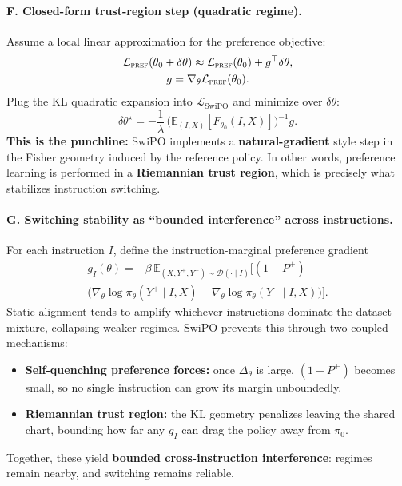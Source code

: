 \vspace{-0.35em}
\paragraph{\textbf{F. Closed-form trust-region step (quadratic regime).}}
Assume a local linear approximation for the preference objective:
\begin{gather*}
\mathcal{L}_{\textsc{pref}}(\theta_0+\delta\theta)
\approx
\mathcal{L}_{\textsc{pref}}(\theta_0)+g^\top\delta\theta,\\
g=\nabla_\theta\mathcal{L}_{\textsc{pref}}(\theta_0).
\end{gather*}
Plug the KL quadratic expansion into $\mathcal{L}_{\mathrm{SwiPO}}$ and minimize over $\delta\theta$:
\[
\delta\theta^\star
=
-\frac{1}{\lambda}\,
\Big(\mathbb{E}_{(I,X)}[F_{\theta_0}(I,X)]\Big)^{-1}g.
\]
\textbf{This is the punchline:} SwiPO implements a \textbf{natural-gradient} style step in the Fisher geometry induced by the reference policy. In other words, preference learning is performed in a \textbf{Riemannian trust region}, which is precisely what stabilizes instruction switching.

\vspace{-0.35em}
\paragraph{\textbf{G. Switching stability as ``bounded interference'' across instructions.}}
For each instruction $I$, define the instruction-marginal preference gradient
{\footnotesize
\begin{multline*}
g_I(\theta)
=
-\beta\,
\mathbb{E}_{(X,Y^+,Y^-)\sim\mathcal{D}(\cdot\mid I)}
\Big[(1-P^+)\\
\big(
\nabla_\theta\log\pi_\theta(Y^+\mid I,X)
-\nabla_\theta\log\pi_\theta(Y^-\mid I,X)
\big)
\Big].
\end{multline*}
}
Static alignment tends to amplify whichever instructions dominate the dataset mixture, collapsing weaker regimes.
SwiPO prevents this through two coupled mechanisms:
\begin{itemize}
\item \textbf{Self-quenching preference forces:} once $\Delta_\theta$ is large, $(1-P^+)$ becomes small, so no single instruction can grow its margin unboundedly.
\item \textbf{Riemannian trust region:} the KL geometry penalizes leaving the shared chart, bounding how far any $g_I$ can drag the policy away from $\pi_0$.
\end{itemize}
Together, these yield \textbf{bounded cross-instruction interference}: regimes remain nearby, and switching remains reliable.

